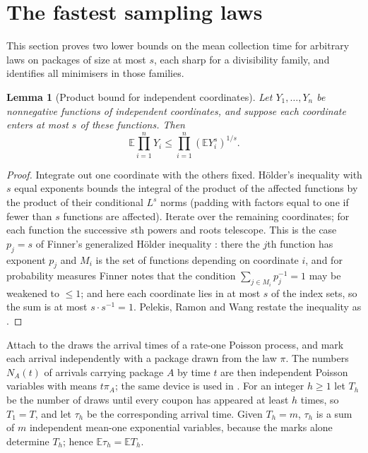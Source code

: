 \documentclass[11pt,a4paper]{article}
\newtheorem{lemma}[theorem]{Lemma}
\theoremstyle{remark}
\newcommand{\E}{\mathbb E}
\begin{document}
\section{The fastest sampling laws}
\label{sec:minimum}
This section proves two lower bounds on the mean collection time for arbitrary laws on packages of size at most $s$, each sharp for a divisibility family, and identifies all minimisers in those families.

\begin{lemma}[Product bound for independent coordinates]\label{lem:read}
Let $Y_1,\dots,Y_n$ be nonnegative functions of independent coordinates, and suppose each coordinate enters at most $s$ of these functions. Then
\[
 \E\prod_{i=1}^nY_i\le\prod_{i=1}^n(\E Y_i^s)^{1/s}.
\]
\end{lemma}
\begin{proof}
Integrate out one coordinate with the others fixed. H\"older's inequality with $s$ equal exponents bounds the integral of the product of the affected functions by the product of their conditional $L^s$ norms (padding with factors equal to one if fewer than $s$ functions are affected). Iterate over the remaining coordinates; for each function the successive $s$th powers and roots telescope. This is the case $p_j=s$ of Finner's generalized H\"older inequality \cite[Theorem~2.1 and (3.1)]{finner}: there the $j$th function has exponent $p_j$ and $M_i$ is the set of functions depending on coordinate $i$, and for probability measures Finner notes that the condition $\sum_{j\in M_i}p_j^{-1}=1$ may be weakened to $\le1$; and here each coordinate lies in at most $s$ of the index sets, so the sum is at most $s\cdot s^{-1}=1$. Pelekis, Ramon and Wang restate the inequality as \cite[Theorem~2.1]{pelekis}.
\end{proof}

Attach to the draws the arrival times of a rate-one Poisson process, and mark each arrival independently with a package drawn from the law $\pi$. The numbers $N_A(t)$ of arrivals carrying package $A$ by time $t$ are then independent Poisson variables with means $t\pi_A$; the same device is used in \cite{flm}. For an integer $h\ge1$ let $T_h$ be the number of draws until every coupon has appeared at least $h$ times, so $T_1=T$, and let $\tau_h$ be the corresponding arrival time. Given $T_h=m$, $\tau_h$ is a sum of $m$ independent mean-one exponential variables, because the marks alone determine $T_h$; hence $\E\tau_h=\E T_h$.
\end{document}
